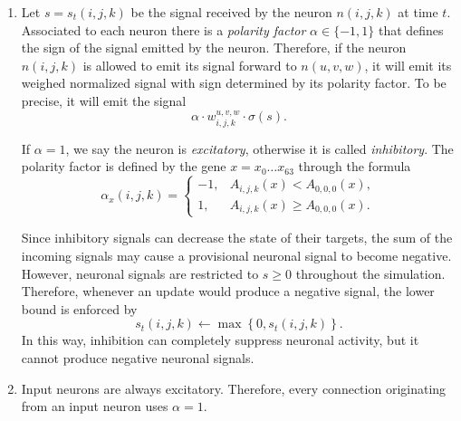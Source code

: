 \documentclass[12pt,a4paper]{article}
\begin{document}
\begin{enumerate}
	The function $\sigma(s) := 1 - e^{-s/\kappa}$ is called \emph{saturation function} and it is used to normalize signals. Here $\kappa \geq 1$ is the \emph{exponential factor} of the brain. It is a genetically defined parameter that controls how quickly a signal saturates. This value is determined by the formula
	$$\kappa(x) = F_{0.4}(x) = \sum_{t=0}^7 \sqrt{1 + t} \cdot 0.4^{x_t},$$
where  $x = x_0 \ldots x_7$ is the corresponding gene.

	We don't need $\kappa$ to assume high values, so the parameters in its formula are such that $\kappa$ is approximately in the interval $[1, 16]$. This is enough for our purposes.
	
	Note that the saturation function is the same for the entire brain.  
	
	\item Let $s = s_t(i, j, k)$ be the signal received by the neuron $n(i, j, k)$ at time $t$. Associated to each neuron there is a \emph{polarity factor} $\alpha \in \{-1, 1\}$ that defines the sign of the signal emitted by the neuron. Therefore, if the neuron $n(i, j, k)$ is allowed to emit its signal forward to $n(u, v, w)$, it will emit its weighed normalized signal with sign determined by its polarity factor. To be precise, it will emit the signal
	$$\alpha \cdot w_{i, j, k}^{u, v, w} \cdot \sigma(s).$$
	
	If $\alpha = 1$, we say the neuron is \emph{excitatory}, otherwise it is called \emph{inhibitory}. The polarity factor is defined by the gene $x = x_0 \ldots x_{63}$ through the formula
	$$\alpha_x(i, j, k) = 
		\left\{\begin{array}{ll}
			-1, & A_{i,j,k}(x) < A_{0,0,0}(x),\\
			1, & A_{i,j,k}(x) \geq A_{0,0,0}(x).
		\end{array}\right.$$
	
	Since inhibitory signals can decrease the state of their targets, the sum of the incoming signals may cause a provisional neuronal signal to become negative. However, neuronal signals are restricted to $s \geq 0$ throughout the simulation. Therefore, whenever an update would produce a negative signal, the lower bound is enforced by
	$$s_t(i,j,k) \leftarrow \max\left\{0, s_t(i,j,k)\right\}.$$
	In this way, inhibition can completely suppress neuronal activity, but it cannot produce negative neuronal signals.
	
	\item Input neurons are always excitatory. Therefore, every connection originating from an input neuron uses $\alpha=1$.
	

\end{enumerate}
\end{document}
